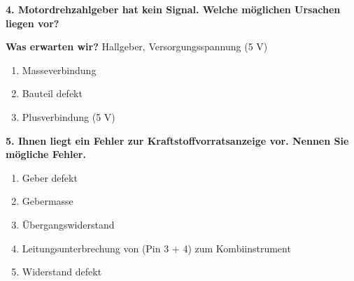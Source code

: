 \textbf{4. Motordrehzahlgeber hat kein Signal. Welche möglichen Ursachen
liegen vor?}

\textbf{Was erwarten wir?} Hallgeber, Versorgungsspannung (5 V)

\begin{enumerate}
\item
  Masseverbindung
\item
  Bauteil defekt
\item
  Plusverbindung (5 V)
\end{enumerate}

\textbf{5. Ihnen liegt ein Fehler zur Kraftstoffvorratsanzeige vor.
Nennen Sie mögliche Fehler.}

\begin{enumerate}
\item
  Geber defekt
\item
  Gebermasse
\item
  Übergangswiderstand
\item
  Leitungsunterbrechung von (Pin 3 + 4) zum Kombiinstrument
\item
  Widerstand defekt
\end{enumerate}
